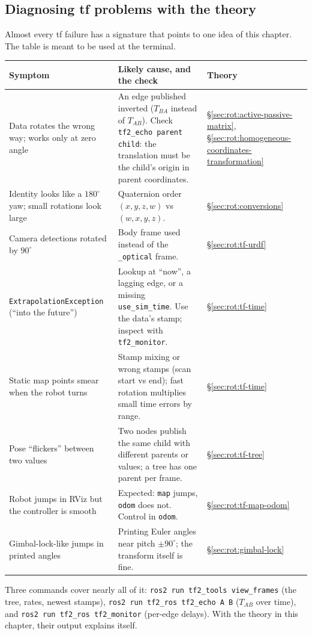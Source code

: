 \subsection{Diagnosing tf problems with the theory}\label{sec:rot:tf-debugging}

Almost every tf failure has a signature that points to one idea of this chapter. The table is meant to be used at the terminal.

\begin{center}\small
\renewcommand{\arraystretch}{1.2}
\begin{tabularx}{\linewidth}{@{}>{\raggedright\arraybackslash}p{4.1cm}>{\raggedright\arraybackslash}X>{\raggedright\arraybackslash}p{2.2cm}@{}}\toprule
Symptom & Likely cause, and the check & Theory\\\midrule
Data rotates the wrong way; works only at zero angle & An edge published inverted ($T_{BA}$ instead of $T_{AB}$). Check \texttt{tf2\_echo parent child}: the translation must be the child's origin in parent coordinates. & \S\ref{sec:rot:active-passive-matrix}, \S\ref{sec:rot:homogeneous-coordinates-transformation}\\
Identity looks like a $180^\circ$ yaw; small rotations look large & Quaternion order $(x,y,z,w)$ vs $(w,x,y,z)$. & \S\ref{sec:rot:conversions}\\
Camera detections rotated by $90^\circ$ & Body frame used instead of the \texttt{\_optical} frame. & \S\ref{sec:rot:tf-urdf}\\
\texttt{ExtrapolationException} (``into the future'') & Lookup at ``now'', a lagging edge, or a missing \texttt{use\_sim\_time}. Use the data's stamp; inspect with \texttt{tf2\_monitor}. & \S\ref{sec:rot:tf-time}\\
Static map points smear when the robot turns & Stamp mixing or wrong stamps (scan start vs end); fast rotation multiplies small time errors by range. & \S\ref{sec:rot:tf-time}\\
Pose ``flickers'' between two values & Two nodes publish the same child with different parents or values; a tree has one parent per frame. & \S\ref{sec:rot:tf-tree}\\
Robot jumps in RViz but the controller is smooth & Expected: \texttt{map} jumps, \texttt{odom} does not. Control in \texttt{odom}. & \S\ref{sec:rot:tf-map-odom}\\
Gimbal-lock-like jumps in printed angles & Printing Euler angles near pitch $\pm90^\circ$; the transform itself is fine. & \S\ref{sec:rot:gimbal-lock}\\\bottomrule
\end{tabularx}
\end{center}

Three commands cover nearly all of it: \texttt{ros2 run tf2\_tools view\_frames} (the tree, rates, newest stamps), \texttt{ros2 run tf2\_ros tf2\_echo A B} ($T_{AB}$ over time), and \texttt{ros2 run tf2\_ros tf2\_monitor} (per-edge delays). With the theory in this chapter, their output explains itself.

